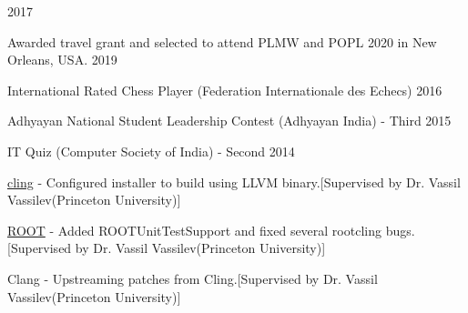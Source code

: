 \documentclass[10pt, letterpaper]{fulldeps}
\begin{document}
\hfill{2017}\\
\vspace{-15pt}

%
%

%
%
\begin{tightitemize}
    \item Awarded travel grant and selected to attend PLMW and POPL 2020 in New Orleans, USA. \hfill{2019}
    \item International Rated Chess Player (Federation Internationale des Echecs) \hfill{2016}
    \item Adhyayan National Student Leadership Contest (Adhyayan India) - Third \hfill{2015}
    \item IT Quiz (Computer Society of India) - Second \hfill{2014}
\end{tightitemize}

\begin{tightitemize}
\item {\href{https://github.com/root-project/cling}{cling}} - Configured installer to build using LLVM binary.[Supervised by Dr. Vassil Vassilev(Princeton University)]
\item {\href{https://github.com/root-project/root}{ROOT}} - Added ROOTUnitTestSupport and fixed several rootcling bugs.[Supervised by Dr. Vassil Vassilev(Princeton University)]
\item {Clang} - Upstreaming patches from Cling.[Supervised by Dr. Vassil Vassilev(Princeton University)]
\end{tightitemize}
\end{document}

